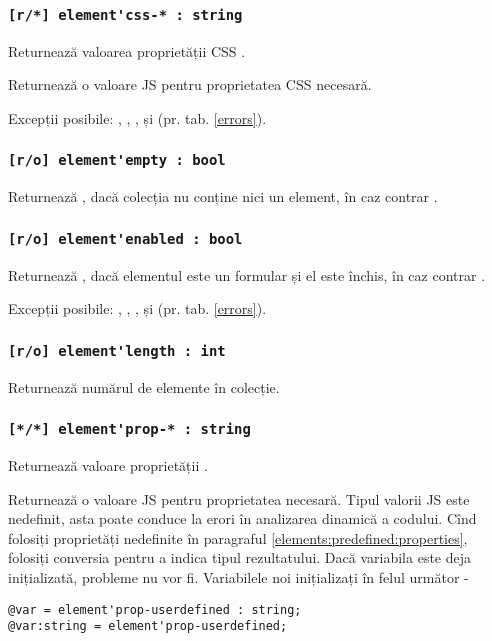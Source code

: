 \subsubsection{\lstinline|[r/*] element'css-* : string|}

\code{[w3c]} Returnează valoarea proprietății CSS \code{*}.

\code{[icL]} Returnează o valoare JS pentru proprietatea CSS necesară.

Excepții posibile: , , ,  și  (pr. tab. \ref{errors}).

\subsubsection{\lstinline|[r/o] element'empty : bool|}

Returnează \true, dacă colecția nu conține nici un element, în caz contrar \false.

\subsubsection{\lstinline|[r/o] element'enabled : bool|}

Returnează \false, dacă elementul este un formular și el este închis, în caz contrar \true.

Excepții posibile: , , ,  și  (pr. tab. \ref{errors}).

\subsubsection{\lstinline|[r/o] element'length : int|}

Returnează numărul de elemente în colecție.

\subsubsection{\lstinline|[*/*] element'prop-* : string|}

\code{[w3c]} Returnează valoare proprietății \code{*}.

\code{[icL]}  Returnează o valoare JS pentru proprietatea necesară. Tipul valorii JS este nedefinit, asta poate conduce la erori în analizarea dinamică a codului. Cînd folosiți proprietăți nedefinite în paragraful \ref{elements:predefined:properties}, folosiți conversia pentru a indica tipul rezultatului. Dacă variabila este deja inițializată, probleme nu vor fi. Variabilele noi inițializați în felul următor -
\begin{lstlisting}[numbers=none]
@var = element'prop-userdefined : string;
@var:string = element'prop-userdefined;
\end{lstlisting}

